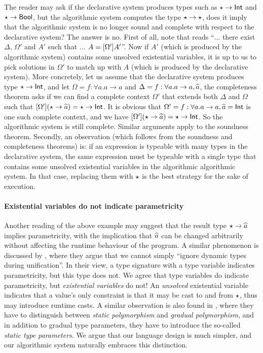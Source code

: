 The reader may ask if the declarative system produces types such as $\star
\to \mathsf{Int}$ and $\star \to \mathsf{Bool}$, but the algorithmic system computes the type
$\star \to \star$, does it imply that the algorithmic system is no longer
sound and complete with respect to the declarative system? The answer is no.
First of all, note that  reads ``$\dots$ there exist
$\Delta$, $\Omega'$ and $A'$ such that $\dots$ $A = [\Omega']A'$''.
Now if $A'$ (which is produced by the algorithmic system) contains some unsolved
existential variables, it is up to us to pick solutions in $\Omega'$ to match up
with $A$ (which is produced by the declarative system). More concretely, let us
assume that the declarative system produces type $\star \to \mathsf{Int}$, and let
$\Omega = f : \forall a. a \to a$ and $\Delta = f : \forall a. a \to a, \widehat{a}$,
the completeness theorem asks if we can find a complete context $\Omega'$ that
extends both $\Delta$ and $\Omega$ such that $[\Omega'](\star \to
  \widehat{a}) = \star \to \mathsf{Int}$. It is obvious that $\Omega' = f : \forall a. a
\to a, \widehat{a} = \mathsf{Int}$ is one such complete context, and we have
$[\Omega'](\star \to \widehat{a}) = \star \to \mathsf{Int}$. So the
algorithmic system is still complete. Similar arguments apply to the soundness
theorem. 
Secondly, an observation (which follows from the soundness and
completeness theorems) is: if an
expression is typeable with many types in the declarative system, the same expression must be
typeable with a single type that contains some unsolved existential variables in the algorithmic
algorithmic system.
In that case, replacing them with $\star$ is the best
strategy for the sake of execution.

\paragraph{Existential variables do not indicate parametricity}

Another reading of the above example may suggest that the result type $\star
\to \widehat{a}$ implies parametricity, with the implication that $\widehat{a}$ can be
changed arbitrarily without affecting the runtime behaviour of the
program. A similar phenomenon is discussed by \citet{siek2008gradual}, where they
argue that we cannot simply ``ignore dynamic types during unification''. In
their view, a type signature with a type variable indicates parametricity, but
this type does not. We agree that type variables do indicate parametricity, but
\textit{existential variables} do not! An \textit{unsolved} existential variable
indicates that a value's only constraint is that it may be cast to and from
$\star$, thus may introduce runtime casts. A similar observation is also
found in \citet{garcia2015principal}, where they have to distinguish between
\textit{static polymorphism} and \textit{gradual polymorphism}, and in addition
to gradual type parameters, they have to introduce the so-called \textit{static
  type parameters}. We argue that our language design is much simpler, and our
algorithmic system naturally embraces this distinction.

